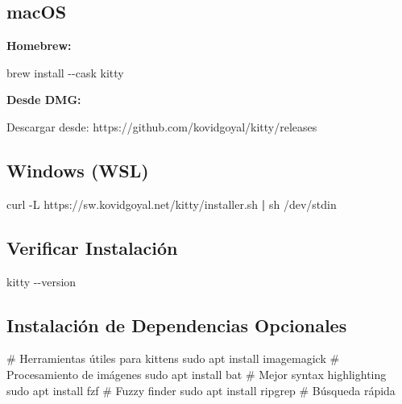 \documentclass[
  doc,
  floatsintext,
  longtable,
  a4paper,
  nolmodern,
  notxfonts,
  notimes,
  12pt,
  colorlinks=true,linkcolor=blue,citecolor=blue,urlcolor=blue]{apa7}
\newenvironment{Shaded}{\begin{snugshade}}{\end{snugshade}}
\newcommand{\AttributeTok}[1]{\textcolor[rgb]{0.40,0.45,0.13}{#1}}
\newcommand{\CommentTok}[1]{\textcolor[rgb]{0.37,0.37,0.37}{#1}}
\newcommand{\ExtensionTok}[1]{\textcolor[rgb]{0.00,0.23,0.31}{#1}}
\newcommand{\FunctionTok}[1]{\textcolor[rgb]{0.28,0.35,0.67}{#1}}
\newcommand{\KeywordTok}[1]{\textcolor[rgb]{0.00,0.23,0.31}{\textbf{#1}}}
\newcommand{\NormalTok}[1]{\textcolor[rgb]{0.00,0.23,0.31}{#1}}
\begin{document}
\subsection{macOS}\label{macos}

\textbf{Homebrew:}

\begin{Shaded}
\begin{Highlighting}[]
\ExtensionTok{brew}\NormalTok{ install }\AttributeTok{{-}{-}cask}\NormalTok{ kitty}
\end{Highlighting}
\end{Shaded}

\textbf{Desde DMG:}

Descargar desde: https://github.com/kovidgoyal/kitty/releases

\subsection{Windows (WSL)}\label{windows-wsl}

\begin{Shaded}
\begin{Highlighting}[]
\ExtensionTok{curl} \AttributeTok{{-}L}\NormalTok{ https://sw.kovidgoyal.net/kitty/installer.sh }\KeywordTok{|} \FunctionTok{sh}\NormalTok{ /dev/stdin}
\end{Highlighting}
\end{Shaded}

\subsection{Verificar Instalación}\label{verificar-instalaciuxf3n}

\begin{Shaded}
\begin{Highlighting}[]
\ExtensionTok{kitty} \AttributeTok{{-}{-}version}
\end{Highlighting}
\end{Shaded}

\subsection{Instalación de Dependencias
Opcionales}\label{instalaciuxf3n-de-dependencias-opcionales}

\begin{Shaded}
\begin{Highlighting}[]
\CommentTok{\# Herramientas útiles para kittens}
\FunctionTok{sudo}\NormalTok{ apt install imagemagick          }\CommentTok{\# Procesamiento de imágenes}
\FunctionTok{sudo}\NormalTok{ apt install bat                  }\CommentTok{\# Mejor syntax highlighting}
\FunctionTok{sudo}\NormalTok{ apt install fzf                  }\CommentTok{\# Fuzzy finder}
\FunctionTok{sudo}\NormalTok{ apt install ripgrep              }\CommentTok{\# Búsqueda rápida}
\end{Highlighting}
\end{Shaded}
\end{document}
